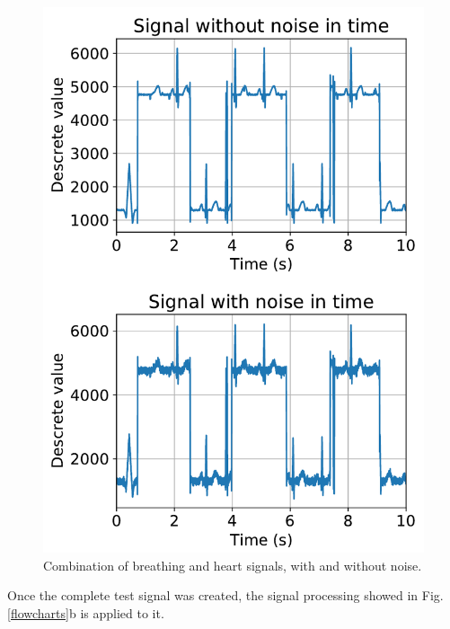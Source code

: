 \documentclass[twoside, twocolumn, spanish] {article}
\begin{document}
\begin{figure}[!h]
\centering
\includegraphics[width=\columnwidth]{imag/proc3}
\caption{Combination of breathing and heart signals, with and without noise.}  \label{combination}
\end{figure}

Once the complete test signal was created, the signal processing showed in Fig. \ref{flowcharts}b is applied to it. 
\end{document}
